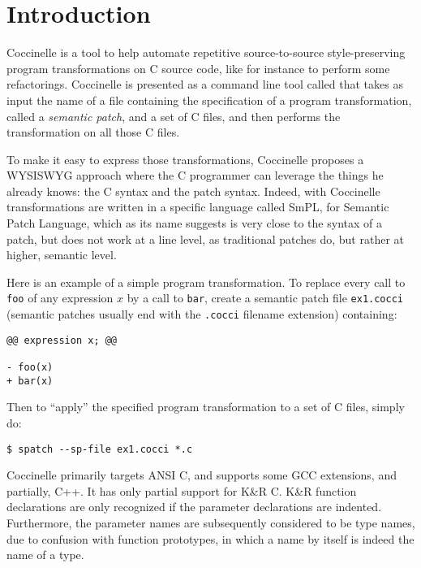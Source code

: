 \chapter{Introduction}

Coccinelle is a tool to help automate repetitive
source-to-source style-preserving program transformations
on C source code, like for instance to perform some refactorings.
Coccinelle is presented as a command line tool called \spatch that takes
as input the name of a file containing the specification of a program
transformation, called a {\em semantic patch}, and a set of C files,
and then performs the transformation on all those C files.

To make it easy to express those transformations,
Coccinelle proposes a WYSISWYG approach where the C programmer
can leverage the things he already knows: the C syntax
and the patch syntax. Indeed, with Coccinelle transformations
are written in a specific language called SmPL, for
Semantic Patch Language, which as its name suggests is very
close to the syntax of a patch, but does not
work at a line level, as traditional patches do,
but rather at higher, semantic level.

Here is an example of a simple program transformation.
To replace every call to \verb+foo+ of any expression $x$
by a call to \verb+bar+, create a semantic patch file \verb+ex1.cocci+
(semantic patches usually end with the \verb+.cocci+  filename extension)
containing:
\begin{verbatim}
@@ expression x; @@

- foo(x)
+ bar(x)

\end{verbatim}

Then to ``apply'' the specified program transformation to a set of C files,
simply do:
\begin{verbatim}
$ spatch --sp-file ex1.cocci *.c
\end{verbatim}


Coccinelle primarily targets ANSI C, and supports some GCC extensions, and partially, C++.  It
has only partial support for K\&R C.  K\&R function declarations are only
recognized if the parameter declarations are indented.  Furthermore, the
parameter names are subsequently considered to be type names, due to
confusion with function prototypes, in which a name by itself is indeed the
name of a type.








